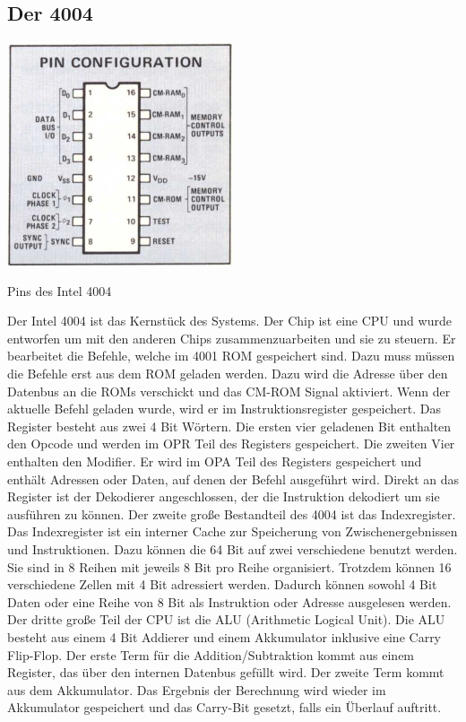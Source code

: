 \subsection{Der 4004}
\begin{floatingfigure}[Hr]{.5\textwidth}
	\vspace{-10pt}
	\includegraphics[width=0.5\textwidth]{figures/pins_4004.png}
	\caption{Pins des Intel 4004}
	\label{fig:pins_4004}
\end{floatingfigure}
Der Intel 4004 ist das Kernstück des Systems. Der Chip ist eine CPU und wurde entworfen um mit den anderen Chips zusammenzuarbeiten und sie zu steuern. Er bearbeitet die Befehle, welche im 4001 ROM gespeichert sind. Dazu muss müssen die Befehle erst aus dem ROM geladen werden.
Dazu wird die Adresse über den Datenbus an die ROMs verschickt und das CM-ROM Signal aktiviert. Wenn der aktuelle Befehl geladen wurde, wird er im Instruktionsregister gespeichert. Das Register besteht aus zwei 4 Bit Wörtern. 
Die ersten vier geladenen Bit enthalten den Opcode und werden im OPR Teil des Registers gespeichert. Die zweiten Vier enthalten den Modifier. Er wird im OPA Teil des Registers gespeichert und enthält Adressen oder Daten, auf denen der Befehl ausgeführt wird. Direkt an das Register ist der Dekodierer angeschlossen, der die Instruktion dekodiert um sie ausführen zu können. Der zweite große Bestandteil des 4004 ist das Indexregister.
 Das Indexregister ist ein interner Cache zur Speicherung von Zwischenergebnissen und Instruktionen.
 Dazu können die 64 Bit auf zwei verschiedene benutzt werden. Sie sind in 8 Reihen mit jeweils 8 Bit pro Reihe organisiert. Trotzdem können 16 verschiedene Zellen mit 4 Bit adressiert werden. Dadurch können sowohl 4 Bit Daten oder eine Reihe von 8 Bit als Instruktion oder Adresse ausgelesen werden. 
Der dritte große Teil der CPU ist die ALU (Arithmetic Logical Unit). Die ALU besteht aus einem 4 Bit Addierer und einem Akkumulator inklusive eine Carry Flip-Flop. Der erste Term für die Addition/Subtraktion kommt aus einem Register, das über den internen Datenbus gefüllt wird. Der zweite Term kommt aus dem Akkumulator. Das Ergebnis der Berechnung wird wieder im Akkumulator gespeichert und das Carry-Bit gesetzt, falls ein Überlauf auftritt.
